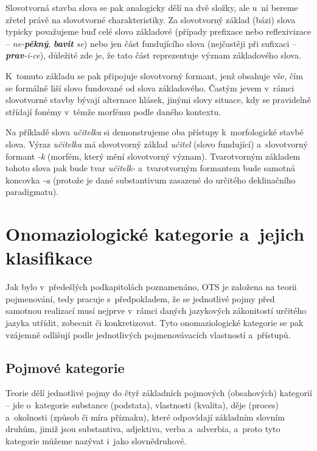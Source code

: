 Slovotvorná stavba slova se pak analogicky dělí na dvě složky, ale u~ní
bereme zřetel právě na slovotvorné charakteristiky. Za slovotvorný
základ (bázi) slova typicky považujeme buď celé slovo základové (případy
prefixace nebo reflexivizace -- \emph{ne-\textbf{pěkný}},
\emph{\textbf{bavit} se}) nebo jen část fundujícího slova (nejčastěji
při sufixaci -- \emph{\textbf{prav}-i-ce}), důležité zde je, že tato
část reprezentuje význam základového slova.
\parencite{enc-slov-zaklad17}

K~tomuto základu se pak připojuje slovotvorný formant, jenž obsahuje
vše, čím se formálně liší slovo fundované od slova základového. Častým
jevem v~rámci slovotvorné stavby bývají alternace hlásek, jinými slovy
situace, kdy se pravidelně střídají fonémy v~témže morfému podle daného
kontextu.~\parencite[97]{dokulil00}

Na příkladě slova \emph{učitelka} si demonstrujeme oba přístupy
k~morfologické stavbě slova. Výraz \emph{učitelka} má slovotvorný základ
\emph{učitel} (slovo fundující) a~slovotvorný formant \emph{-k} (morfém,
který mění slovotvorný význam). Tvarotvorným základem tohoto slova pak
bude tvar \emph{učitelk-} a~tvarotvorným formantem bude samotná koncovka
\emph{-a} (protože je dané substantivum zasazené do určitého
deklinačního paradigmatu).

\hypertarget{onomaziologickuxe9-kategorie-a-jejich-klasifikace}{%
\section{Onomaziologické kategorie a~jejich
klasifikace}\label{onomaziologickuxe9-kategorie-a-jejich-klasifikace}}

Jak bylo v~předešlých podkapitolách poznamenáno, OTS je založena na
teorii pojmenování, tedy pracuje s~předpokladem, že se jednotlivé pojmy
před samotnou realizací musí nejprve v~rámci daných jazykových
zákonitostí určitého jazyka utřídit, zobecnit či konkretizovat. Tyto
onomaziologické kategorie se pak vzájemně odlišují podle jednotlivých
pojmenovávacích vlastností a~přístupů.~\parencite[29]{dokulil62}

\hypertarget{pojmovuxe9-kategorie}{%
\subsection{Pojmové kategorie}\label{pojmovuxe9-kategorie}}

Teorie dělí jednotlivé pojmy do čtyř základních pojmových (obsahových)
kategorií -- jde o~kategorie substance (podstata), vlastnosti (kvalita),
děje (proces) a~okolnosti (způsob či míra příznaku), které odpovídají
základním slovním druhům, jimiž jsou substantiva, adjektiva, verba
a~adverbia, a~proto tyto kategorie můžeme nazývat i~jako slovnědruhové.
\parencite[102]{dokulil00}

